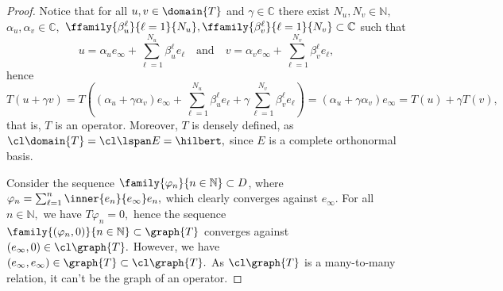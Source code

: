 \begin{proof}
    Notice that for all \(u, v \in \domain{T}\) and \(\gamma \in \mathbb{C}\) there exist \(N_u, N_v \in \mathbb{N},\) \(\alpha_u, \alpha_v \in \mathbb{C},\) 
    \(\ffamily{\beta_u^\ell}{\ell = 1}{N_u}, \ffamily{\beta_v^\ell}{\ell = 1}{N_v} \subset \mathbb{C}\) such that
    \begin{equation*}
        u = \alpha_u e_\infty + \sum_{\ell = 1}^{N_u}{\beta_u^\ell e_\ell}
        \quad\text{and}\quad
        v = \alpha_v e_\infty + \sum_{\ell = 1}^{N_v}{\beta_v^\ell e_\ell},
    \end{equation*}
    hence
    \begin{equation*}
        T(u + \gamma v) = T\left((\alpha_u + \gamma\alpha_v)e_\infty + \sum_{\ell = 1}^{N_u}{\beta_u^\ell e_\ell} + \gamma\sum_{\ell = 1}^{N_v}{\beta_v^\ell e_\ell}\right) = (\alpha_u + \gamma \alpha_v) e_\infty = T(u) + \gamma T(v),
    \end{equation*}
    that is, \(T\) is an operator. Moreover, \(T\) is densely defined, as \(\cl \domain{T} = \cl \lspan E = \hilbert,\) since \(E\) is a complete orthonormal basis.

    Consider the sequence \(\family{\varphi_n}{n \in \mathbb{N}} \subset D\), where \(\varphi_n = \sum_{\ell = 1}^n \inner{e_n}{e_\infty}e_n,\) which clearly converges against \(e_\infty.\) For all \(n \in \mathbb{N},\) we have \(T \varphi_n = 0,\) hence the sequence \(\family{(\varphi_n, 0)}{n \in \mathbb{N}} \subset \graph{T}\) converges against \((e_\infty, 0) \in \cl \graph{T}.\) However, we have \((e_\infty, e_\infty) \in \graph{T} \subset \cl \graph{T}.\) As \(\cl\graph{T}\) is a many-to-many relation, it can't be the graph of an operator.
\end{proof}

